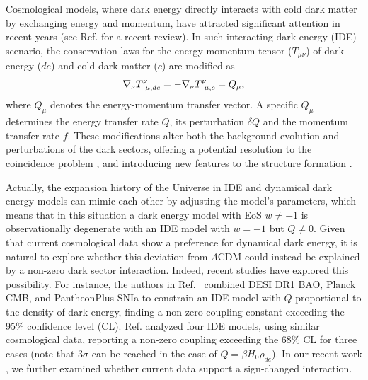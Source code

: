 \documentclass[a4paper,11pt]{article}
\begin{document}
Cosmological models, where dark energy directly interacts with cold dark matter by exchanging energy and momentum, have attracted significant attention in recent years \cite{He:2008tn,He:2009mz,He:2009pd,Guo:2004xx,Wei:2007ut,Cai:2009ht,He:2010im,Boehmer:2008av,Guo:2007zk,Xia:2009zzb,Wei:2010cs,Li:2011ga,Zhang:2004gc,Li:2013bya,Wang:2013qy,Pourtsidou:2013nha,Yang:2015tzc,Yang:2017ccc,Cai:2017yww,Yang:2018euj,Kase:2020hst,Linton:2021cgd,Faraoni:2014vra,Zhang:2012uu,Zhang:2013lea,Valiviita:2008iv,Cai:2016hea,Abedin:2025yru,Escamilla:2023shf,Pan:2025qwy,Aboubrahim:2024cyk,DiValentino:2021izs,DiValentino:2020kpf,Silva:2025hxw,Forconi:2023hsj,Nunes:2022bhn,Wang:2016lxa} (see Ref. \cite{Wang:2024vmw} for a recent review). In such interacting dark energy (IDE) scenario, the conservation laws for the energy-momentum tensor ($T_{\mu\nu}$) of dark energy ($de$) and cold dark matter ($c$) are modified as 
\begin{equation}
  \label{eq:energyexchange} \nabla_\nu T^\nu_{\hphantom{j}\mu,de} = -\nabla_\nu T^\nu_{\hphantom{j}\mu,c}  = Q_\mu,
\end{equation} 
where $Q_\mu$ denotes the energy-momentum transfer vector. A specific $Q_{\mu}$ determines the energy transfer rate $Q$, its perturbation $\delta Q$ and the momentum transfer rate $f$. These modifications alter both the background evolution and perturbations of the dark sectors, offering a potential resolution to the coincidence problem \cite{Amendola:1999er,Comelli:2003cv,Zhang:2005rg,Cai:2004dk}, and introducing new features to the structure formation \cite{Amendola:2001rc,Bertolami:2007zm,Koyama:2009gd}.


Actually, the expansion history of the Universe in IDE and dynamical dark energy models can mimic each other by adjusting the model's parameters, which means that in this situation a dark energy model with EoS $w\neq -1$ is observationally degenerate with an IDE model with $w=-1$ but $Q\neq 0$. Given that current cosmological data show a preference for dynamical dark energy, it is natural to explore whether this deviation from $\Lambda$CDM could instead be explained by a non-zero dark sector interaction. Indeed, recent studies have explored this possibility. For instance, the authors in Ref.~\cite{Giare:2024smz} combined DESI DR1 BAO, Planck CMB, and PantheonPlus SNIa to constrain an IDE model with $Q$ proportional to the density of dark energy, finding a non-zero coupling constant exceeding the 95\% confidence level (CL). Ref. \cite{Li:2024qso} analyzed four IDE models, using similar cosmological data, reporting a non-zero coupling exceeding the 68\% CL for three cases (note that 3$\sigma$ can be reached in the case of $Q=\beta H_0\rho_{de}$). In our recent work \cite{Li:2025owk}, we further examined whether current data support a sign-changed interaction. 
\end{document}
